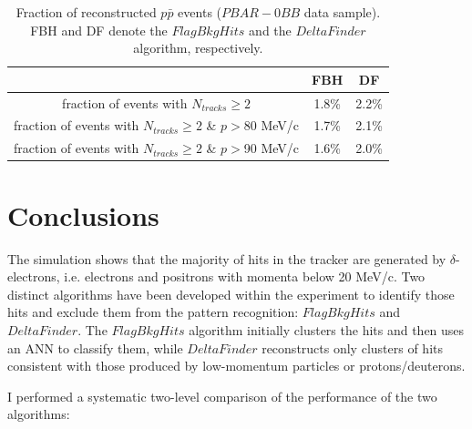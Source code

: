 \begin{center}
        \begin{table}[h!]
        \centering
        \renewcommand{\arraystretch}{1.}
        \begin{tabular}{| c | c | c |} 
            \hline
            &  FBH & DF\\
            \hline
            fraction of events with $N_{tracks} \geq 2$ &  1.8\% & 2.2\%\\
            \hline
            fraction of events with $N_{tracks} \geq 2$ \& $p>$80 MeV/c & 1.7\% & 2.1\%\\
            \hline
            fraction of events with $N_{tracks} \geq 2$ \& $p>$90 MeV/c & 1.6\% & 2.0\%\\
            \hline
            \end{tabular}
        \caption{Fraction of reconstructed $p\bar{p}$ events 
        ($PBAR-0BB$ data sample). FBH and DF denote the $FlagBkgHits$ and the $DeltaFinder$ algorithm, respectively.}
        \label{tab:recoeffpbar}
        \end{table}
\end{center}

\section{Conclusions}
The simulation shows that the majority 
of hits in the tracker are generated by 
$\delta$-electrons, i.e. electrons 
and positrons with momenta below 20 MeV/c. 
Two distinct algorithms 
have been developed within the experiment to 
identify those hits and exclude 
them from the pattern recognition: 
$FlagBkgHits$ and $DeltaFinder$. 
The $FlagBkgHits$ algorithm initially 
clusters the hits and then uses an ANN 
to classify them, while $DeltaFinder$ 
reconstructs only clusters of hits  
consistent with those produced by low-momentum particles or protons/deuterons.

I performed a systematic two-level comparison of the performance of the two algorithms:

